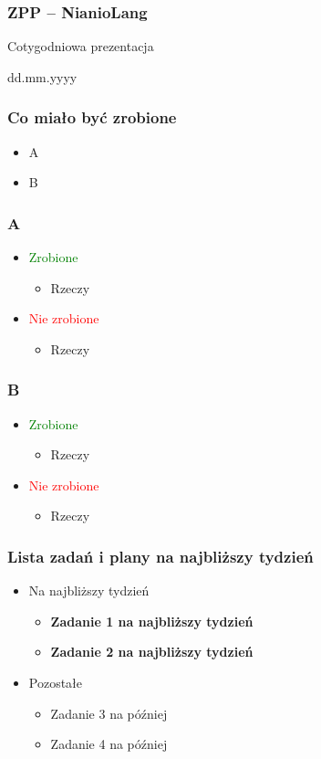 \documentclass{beamer}
\begin{document}
	\begin{frame}
		\frametitle{ZPP -- NianioLang}
		Cotygodniowa prezentacja
		
		dd.mm.yyyy
	\end{frame}
	
	\begin{frame}
		\frametitle{Co miało być zrobione}
		\begin{itemize}
		 \item A
		 \item B
		\end{itemize}
	\end{frame}
	
	\begin{frame}
		\frametitle{A}
		\begin{itemize}
			\item\textcolor{green}{Zrobione}
			\begin{itemize}
				\item Rzeczy
			\end{itemize}
			\item\textcolor{red}{Nie zrobione}
			\begin{itemize}
				\item Rzeczy
			\end{itemize}
		\end{itemize}
	\end{frame}
	
	\begin{frame}
		\frametitle{B}
		\begin{itemize}
			\item\textcolor{green}{Zrobione}
			\begin{itemize}
				\item Rzeczy
			\end{itemize}
			\item\textcolor{red}{Nie zrobione}
			\begin{itemize}
				\item Rzeczy
			\end{itemize}
		\end{itemize}
	\end{frame}
	
	\begin{frame}
		\frametitle{Lista zadań i plany na najbliższy tydzień}
		\begin{itemize}
			\item{Na najbliższy tydzień}
			\begin{itemize}
				\item{\textbf{Zadanie 1 na najbliższy tydzień}}
				\item{\textbf{Zadanie 2 na najbliższy tydzień}}
			\end{itemize}
			\item{Pozostałe}
			\begin{itemize}
				\item{Zadanie 3 na później}
				\item{Zadanie 4 na później}
			\end{itemize}
		\end{itemize}
	\end{frame}
\end{document}
